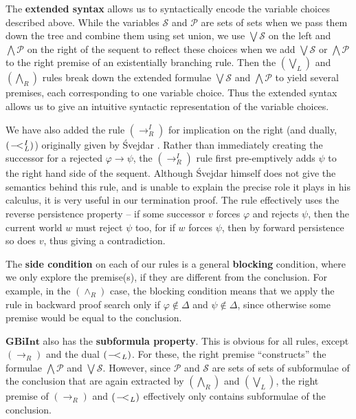 \documentclass{llncs}
\numberwithin{equation}{section}
\newcommand{\Pred}{{\mathcal{P}}}
\newcommand{\Succ}{{\mathcal{S}}}
\newcommand{\ExAnd}{\wedge}
\newcommand{\ExImp}{\rightarrow}
\newcommand{\Imp}{\rightarrow}
\newcommand{\WeakImp}{
\begin{picture}(10,10)
     \put(1,0){$-$}
     \put(7,0){$<$}
   \end{picture}
   \;\; 
}
\newcommand{\GBiInt}{\mathbf{GBiInt}}
\newcommand{\AndRightRule}{(\ExAnd_R)}
\newcommand{\ImpRightRule}{({\Imp_R})}
\newcommand{\ImpRightRuleI}{({\Imp_R^I})}
\newcommand{\WeakImpLeftRule}{({\WeakImp_L})}
\newcommand{\WeakImpLeftRuleI}{({\WeakImp_L^I})}
\newcommand{\SpecialRightRule}{({\bigwedge_R})}
\newcommand{\SpecialLeftRule}{({\bigvee_L})}
\begin{document}
The \textbf{extended syntax} allows us to syntactically encode the variable choices described above. While the variables $\Succ$ and $\Pred$ are sets of sets when we pass them down the tree and combine them using set union, we use $\bigvee \Succ$ on the left and $\bigwedge \Pred$ on the right of the sequent to reflect these choices when we add $\bigvee \Succ$ or $\bigwedge \Pred$ to the right premise of an existentially branching rule. Then the $\SpecialLeftRule$ and $\SpecialRightRule$ rules break down the extended formulae $\bigvee \Succ$ and $\bigwedge \Pred$ to yield several premises, each corresponding to one variable choice. Thus the extended syntax allows us to give an intuitive syntactic representation of the variable choices.

We have also added the rule $\ImpRightRuleI$ for implication on the
right (and dually, $\WeakImpLeftRuleI$)
originally given by \'{S}vejdar \cite{svejdar2006}. Rather than
immediately creating the successor for a rejected $\varphi
\ExImp \psi$, the $\ImpRightRuleI$ rule first pre-emptively adds
$\psi$ to the right hand side of the sequent. Although \'{S}vejdar
himself does not give the semantics behind this rule, and is unable to
explain the precise role it plays in his calculus, it is very
useful in our termination proof. The rule effectively uses the reverse
persistence property -- if some successor $v$ forces $\varphi$ and
rejects $\psi$, then the current world $w$ must reject $\psi$ too, for
if $w$ forces $\psi$, then by forward persistence so does $v$, thus
giving a contradiction.

The \textbf{side condition} on each of our rules is a general \textbf{blocking} condition, where we only explore the premise(s), if they are different from the conclusion. For example, in the $\AndRightRule$ case, the blocking condition means that we apply the rule in backward proof search only if $\varphi \not\in \Delta$ and $\psi \not\in \Delta$, since otherwise some premise would be equal to the conclusion.

$\GBiInt$ also has the \textbf{subformula property}. This is obvious
for all rules, except $\ImpRightRule$ and the dual $\WeakImpLeftRule$.
For these, the right premise ``constructs'' the formulae $\bigwedge
\Pred$ and $\bigvee \Succ$. However, since $\Pred$ and $\Succ$ are
sets of sets of subformulae of the conclusion that are again extracted
by $\SpecialRightRule$ and $\SpecialLeftRule$, the right premise of
$\ImpRightRule$ and $\WeakImpLeftRule$ effectively only contains
subformulae of the conclusion.
\end{document}

